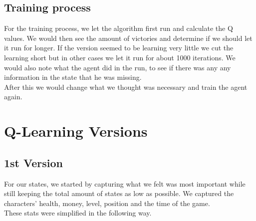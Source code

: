 \documentclass{article}
\begin{document}
  \subsection{Training process}
  For the training process, we let the algorithm first run and calculate the Q values.
  We would then see the amount of victories and determine if we should let it run for longer. If the version seemed to be learning very little
  we cut the learning short but in other cases we let it run for about 1000 iterations.
  We would also note what the agent did in the run, to see if there was any any information
  in the state that he was missing.\\
  After this we would change what we thought was necessary and train the agent again.

  \section{Q-Learning Versions}
  \subsection{1st Version}
  For our states, we started by capturing what we felt was most important while still keeping the total amount of states as low as possible.
  We captured the characters' health, money, level, position and the time of the game.\\
  These stats were simplified in the following way.\\
\end{document}
